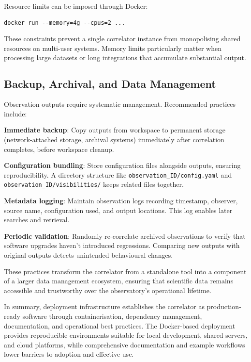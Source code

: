 Resource limits can be imposed through Docker:

\begin{verbatim}
docker run --memory=4g --cpus=2 ...
\end{verbatim}

These constraints prevent a single correlator instance from monopolising shared resources on multi-user systems. Memory limits particularly matter when processing large datasets or long integrations that accumulate substantial output.

\subsection{Backup, Archival, and Data Management}

Observation outputs require systematic management. Recommended practices include:

\textbf{Immediate backup}: Copy outputs from workspace to permanent storage (network-attached storage, archival systems) immediately after correlation completes, before workspace cleanup.

\textbf{Configuration bundling}: Store configuration files alongside outputs, ensuring reproducibility. A directory structure like \texttt{observation\_ID/config.yaml} and \texttt{observation\_ID/visibilities/} keeps related files together.

\textbf{Metadata logging}: Maintain observation logs recording timestamp, observer, source name, configuration used, and output locations. This log enables later searches and retrieval.

\textbf{Periodic validation}: Randomly re-correlate archived observations to verify that software upgrades haven't introduced regressions. Comparing new outputs with original outputs detects unintended behavioural changes.

These practices transform the correlator from a standalone tool into a component of a larger data management ecosystem, ensuring that scientific data remains accessible and trustworthy over the observatory's operational lifetime.

In summary, deployment infrastructure establishes the correlator as production-ready software through containerisation, dependency management, documentation, and operational best practices. The Docker-based deployment provides reproducible environments suitable for local development, shared servers, and cloud platforms, while comprehensive documentation and example workflows lower barriers to adoption and effective use.
